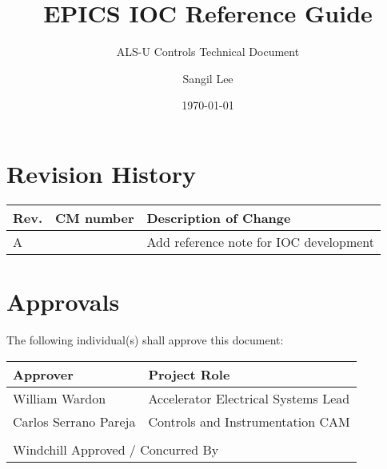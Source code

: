 \documentclass[11pt
  , letterpaper
  , article
  , oneside
  , showtrims
]{memoir}
\begin{document}
\date{\today}
\title{EPICS IOC Reference Guide}
\subtitle{ALS-U Controls Technical Document}
\author{Sangil Lee}

\showtrimson

\jhleetitle
\newpage
\tableofcontents
\newpage



\chapter{Revision History}
\begin{table}[!h]
  \centering
  \begin{tabularx}{\textwidth}{l|r|X}
    \toprule
    \textbf{Rev.} & \textbf{CM number}  & \textbf{Description of Change} \\
    \midrule
    A             &                     & Add reference note for IOC development \\
    \bottomrule
  \end{tabularx}
\end{table}

\chapter{Approvals}
The following individual(s) shall approve this document:
\begin{table}[!h]
  \centering
  \begin{tabularx}{\textwidth}{l|l}
    \toprule
    \textbf{Approver} & \textbf{Project Role} \\
    \midrule
    William Wardon        & Accelerator Electrical Systems Lead  \\
    \midrule
    Carlos Serrano Pareja & Controls and Instrumentation CAM \\
    \midrule
    & \\
    \midrule
    \multicolumn{2}{l}{\tiny Windchill Approved / Concurred By} \\
    \bottomrule
  \end{tabularx}
\end{table}
\end{document}
